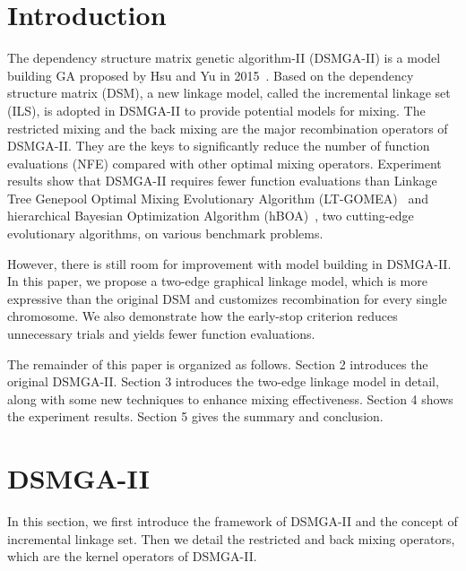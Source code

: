 \section{Introduction}

The dependency structure matrix genetic algorithm-II (DSMGA-II) is a model building GA proposed by Hsu and Yu in 2015~\cite{hsu:DSMGA2}.
Based on the dependency structure matrix (DSM), a new linkage model, called the incremental linkage set (ILS), is adopted in DSMGA-II to provide potential models for mixing. 
The restricted mixing and the back mixing are the major recombination operators of DSMGA-II. 
They are the keys to significantly reduce the number of function evaluations (NFE) compared with other optimal mixing operators. 
Experiment results show that DSMGA-II requires fewer function evaluations than Linkage Tree Genepool Optimal Mixing Evolutionary Algorithm (LT-GOMEA)~\cite{bosman:LT-GOMEA} and hierarchical Bayesian Optimization Algorithm (hBOA)~\cite{pelikan:hBOA}, two cutting-edge evolutionary algorithms, on various benchmark problems. 

However, there is still room for improvement with model building in DSMGA-II. 
In this paper, we propose a two-edge graphical linkage model, which is more expressive than the original DSM and customizes recombination for every single chromosome. 
We also demonstrate how the early-stop criterion reduces unnecessary trials and yields fewer function evaluations.

The remainder of this paper is organized as follows. 
Section 2 introduces the original DSMGA-II. 
Section 3 introduces the two-edge linkage model in detail, along with some new techniques to enhance mixing effectiveness. 
Section 4 shows the experiment results. 
Section 5 gives the summary and conclusion.



\section{DSMGA-II}
In this section, we first introduce the framework of DSMGA-II and the concept of incremental linkage set. 
Then we detail the restricted and back mixing operators, which are the kernel operators of DSMGA-II.


